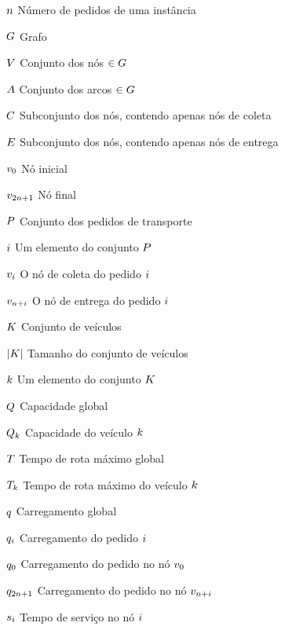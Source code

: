 


\begin{simbolos}
    \item[$n$] Número de pedidos de uma instância
    \item[$G$] Grafo
    \item[$V$] Conjunto dos nós $\in G$
    \item[$A$]{Conjunto dos arcos $\in G$}
    \item[$C$] Subconjunto dos nós, contendo apenas nós de coleta
    \item[$E$] Subconjunto dos nós, contendo apenas nós de entrega
    \item[$v_{0}$] Nó inicial
    \item[$v_{2n + 1}$] Nó final 
    \item[$P$] Conjunto dos pedidos de transporte 
    \item[$i$] Um elemento do conjunto $P$
    \item[$v_{i}$] O nó de coleta do pedido $i$
    \item[$v_{n + i}$] O nó de entrega do pedido $i$
    \item[$K$] Conjunto de veículos
    \item[$|K|$] Tamanho do conjunto de veículos
    \item[$k$] Um elemento do conjunto $K$
    \item[$Q$] Capacidade global
    \item[$Q_{k}$] Capacidade do veículo $k$
    \item[$T$] Tempo de rota máximo global
    \item[$T_k$] Tempo de rota máximo do veículo $k$
    \item[$q$] Carregamento global
    \item[$q_i$] Carregamento do pedido $i$
    \item[$q_{0}$] Carregamento do pedido no nó $v_{0}$
   \item[$q_{2n + 1}$]
     Carregamento do pedido no nó $v_{n + i}$
    \item[$s_{i}$]
      Tempo de serviço no nó $i$

\end{simbolos}
